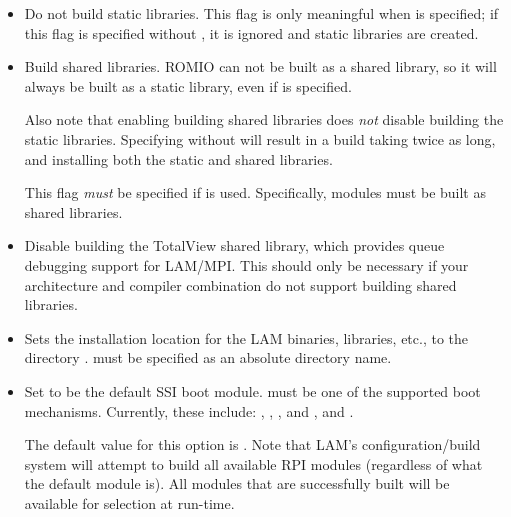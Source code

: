 \begin{itemize}

\item {}
  
  Do not build static libraries.  This flag is only meaningful when
   is specified; if this flag is specified
  without , it is ignored and static libraries
  are created.


\item {}

  Build shared libraries.  ROMIO can not be built as a shared library,
  so it will always be built as a static library, even if
   is specified.

  Also note that enabling building shared libraries does {\em not}
  disable building the static libraries.  Specifying
   without  will
  result in a build taking twice as long, and installing both the
  static and shared libraries.

  This flag {\em must} be specified if  is
  used.  Specifically, modules must be built as shared libraries.


\item {}

  Disable building the TotalView shared library, which provides queue
  debugging support for LAM/MPI.  This should only be necessary if
  your architecture and compiler combination do not support building
  shared libraries.


\item {}

  Sets the installation location for the LAM binaries, libraries,
  etc., to the directory .   must be specified as
  an absolute directory name.


\item {}
  
  Set  to be the default SSI boot module.
   must be one of the supported boot mechanisms.
  Currently, these include: , , , and
  , and .
  
  The default value for this option is .  Note that LAM's
  configuration/build system will attempt to build all available RPI
  modules (regardless of what the default module is).  All 
  modules that are successfully built will be available for selection
  at run-time.


\end{itemize}
